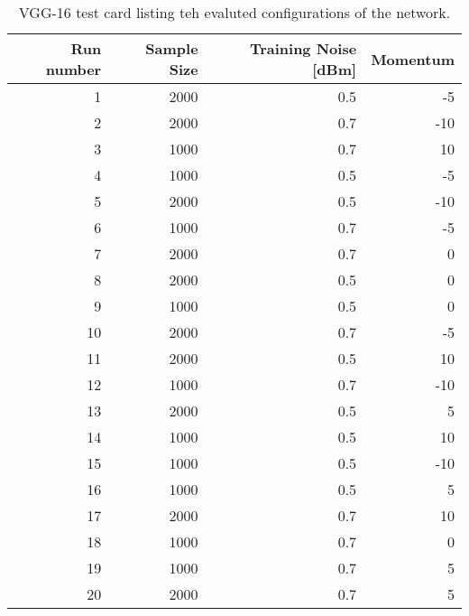   \begin{table}
    \centering
    \begin{tabular}{|r|r|r|r|}
      \hline
      Run number &	Sample Size	& Training Noise [dBm] & Momentum \\
      \hline
      1	& 2000 	& 0.5	& -5 \\
      \hline
      2	& 2000 	& 0.7	& -10 \\
      \hline
      3	& 1000 	& 0.7	& 10 \\
      \hline
      4	& 1000 	& 0.5	& -5 \\
      \hline
      5	& 2000 	& 0.5	& -10 \\
      \hline
      6	& 1000 	& 0.7	& -5 \\
      \hline
      7	& 2000 	& 0.7	& 0 \\
      \hline
      8	& 2000 	& 0.5	& 0 \\
      \hline
      9	& 1000 	& 0.5	& 0 \\
      \hline
      10	& 2000 	& 0.7	& -5 \\
      \hline
      11	& 2000 	& 0.5	& 10 \\
      \hline
      12	& 1000 	& 0.7	& -10 \\
      \hline
      13	& 2000 	& 0.5	& 5 \\
      \hline
      14	& 1000 	& 0.5	& 10 \\
      \hline
      15	& 1000 	& 0.5	& -10 \\
      \hline
      16	& 1000 	& 0.5	& 5 \\
      \hline
      17	& 2000 	& 0.7	& 10 \\
      \hline
      18	& 1000 	& 0.7	& 0 \\
      \hline
      19	& 1000 	& 0.7	& 5 \\
      \hline
      20	& 2000 	& 0.7	& 5 \\
      \hline
    \end{tabular}
    \caption{VGG-16 test card listing teh evaluted configurations of the network.}
    \label{tab:vgg-16_test_card}
  \end{table}
